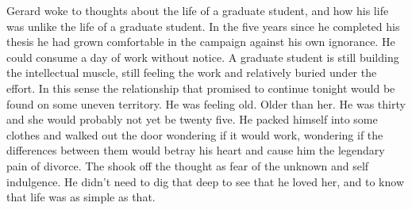 

Gerard woke to thoughts about the life of a graduate student, and how
his life was unlike the life of a graduate student.  In the five years
since he completed his thesis he had grown comfortable in the campaign
against his own ignorance.  He could consume a day of work without
notice.  A graduate student is still building the intellectual muscle,
still feeling the work and relatively buried under the effort.  In
this sense the relationship that promised to continue tonight would be
found on some uneven territory.  He was feeling old.  Older than her.
He was thirty and she would probably not yet be twenty five.  He
packed himself into some clothes and walked out the door wondering if
it would work, wondering if the differences between them would betray
his heart and cause him the legendary pain of divorce.  The shook off
the thought as fear of the unknown and self indulgence.  He didn't
need to dig that deep to see that he loved her, and to know that life
was as simple as that.

\bye
